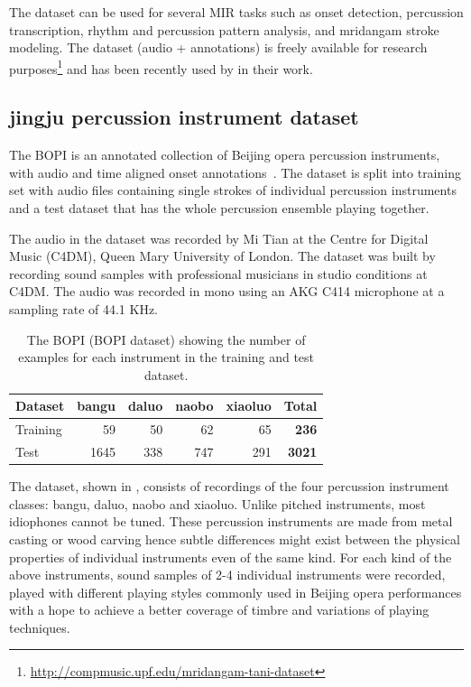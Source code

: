 The dataset can be used for several \gls{MIR} tasks such as onset detection, percussion transcription, rhythm and percussion pattern analysis, and mridangam stroke modeling. The dataset (audio + annotations) is freely available for research purposes\footnote{\url{http://compmusic.upf.edu/mridangam-tani-dataset}} and has been recently used by  in their work. 
%
\subsection{\Gls{jingju} percussion instrument dataset}\label{sec:dataset:bopi}
The \acrfull{BOPI} is an annotated collection of Beijing opera percussion instruments, with audio and time aligned onset annotations~\cite{tian:14:icassp}. The dataset is split into training set with audio files containing single strokes of individual percussion instruments and a test dataset that has the whole percussion ensemble playing together. 

The audio in the dataset was recorded by Mi Tian at the Centre for Digital Music (C4DM), Queen Mary University of London. The dataset was built by recording sound samples with professional musicians in studio conditions at C4DM. The audio was recorded in mono using an AKG C414 microphone at a sampling rate of 44.1 KHz. 
\begin{table}
\centering
\begin{tabular}{@{}lrrrrr@{}}\toprule
Dataset 	& \Gls{bangu} & \Gls{daluo} & \Gls{naobo} & \Gls{xiaoluo} & \textbf{Total}	\\ \midrule
Training 	& 59 		& 50 		& 62 		& 65 			& \textbf{236}		\\
Test 			& 1645  & 338 	& 747 	& 291 		& \textbf{3021} 	\\ \bottomrule
\end{tabular}
\caption[The \gls{jingju} percussion instrument dataset]{The \acrlong{BOPI} (\acrshort{BOPI} dataset) showing the number of examples for each instrument in the training and test dataset.}\label{tab:dataset:bopi}
\end{table}

The dataset, shown in , consists of recordings of the four percussion instrument classes: \gls{bangu}, \gls{daluo}, \gls{naobo} and \gls{xiaoluo}. Unlike pitched instruments, most idiophones cannot be tuned. These percussion instruments are made from metal casting or wood carving hence subtle differences might exist between the physical properties of individual instruments even of the same kind. For each kind of the above instruments, sound samples of 2-4 individual instruments were recorded, played with different playing styles commonly used in Beijing opera performances with a hope to achieve a better coverage of timbre and variations of playing techniques.

